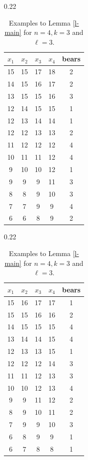 \documentclass[10pt]{article}
\theoremstyle{definition}
\begin{document}
\begin{table}[h] %
\setlength\tabcolsep{0pt} 
\small %
\caption{Examples to Lemma \ref{l-main} 
for $n=4, k = 3$ and  $\ell = 3$.} 
\label{tab:4subt}
\begin{subtable}{0.22\textwidth}
\begin{tabular*}{\linewidth}{@{\extracolsep{\fill}}ccccc}
\toprule
$x_1$ & $x_2$ & $x_3$ & $x_4$  &  bears \\
\midrule
15& 15& 17& 18 & 2  \\
14& 15& 16& 17 & 2  \\
13& 15& 15& 16 & 3  \\
\hline
12& 14& 15& 15 & 1  \\
12& 13& 14& 14 & 1  \\
12& 12& 13& 13 & 2  \\
\hline
11 &12& 12& 12 & 4  \\
10& 11& 11& 12 & 4 \\
9& 10 &10 &12  & 1 \\
\hline
9& 9& 9& 11 & 3  \\
8& 8& 9& 10 & 3 \\
7& 7& 9& 9  & 4 \\
\hline
6& 6& 8 &9 &  2  \\
\bottomrule
\end{tabular*}
\label{tab:sub1}
\end{subtable}
\hfill
\begin{subtable}{0.22\textwidth}
\begin{tabular*}{\linewidth}{@{\extracolsep{\fill}}ccccc}
\toprule
$x_1$ & $x_2$ & $x_3$ & $x_4$  &  bears\\
\midrule
15& 16& 17& 17 & 1 \\
15& 15& 16& 16 & 2 \\
14& 15& 15& 15 & 4 \\ 
\hline
13& 14& 14& 15& 4 \\
12& 13& 13& 15& 1\\ 
12& 12& 12& 14& 3\\
\hline
11& 11& 12& 13& 3\\  
10& 10& 12& 13& 4\\
9 & 9& 11& 12& 2\\
\hline
8 &9 &10 &11 & 2\\ 
7 &9 &9 &10 & 3\\
6 &8 &9 &9  &1\\
\hline
6 &7 &8 &8 &1 \\  

\end{tabular*}
\end{subtable}
\end{table}
\end{document}
